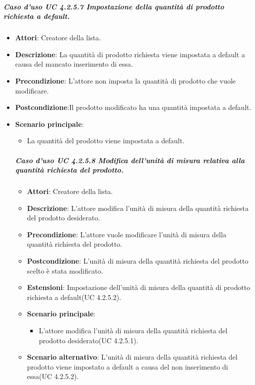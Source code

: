 	
\subparagraph{Caso d'uso UC 4.2.5.7 Impostazione della quantità di prodotto richiesta a default.}
	\begin{itemize}
		\item\textbf{Attori}: Creatore della lista.
		\item\textbf{Descrizione}: La quantità di prodotto richiesta viene impostata a default a causa del mancato inserimento di essa.
		\item\textbf{Precondizione}: L'attore non imposta la quantità di prodotto che vuole modificare.
		\item\textbf{Postcondizione}:Il prodotto modificato ha una quantità  impostata a default.
		\item\textbf{Scenario principale}:
			\begin{itemize}
				\item La quantità del prodotto viene impostata a default.
			\end{itemize}
			
	\subparagraph{Caso d'uso UC 4.2.5.8 Modifica dell'unità di misura relativa alla quantità richiesta del prodotto.}
	\begin{itemize}
		\item\textbf{Attori}: Creatore della lista.
		\item\textbf{Descrizione}: L'attore modifica l'unità di misura della quantità richiesta del prodotto desiderato.
		\item\textbf{Precondizione}: L'attore vuole modificare l'unità di misura della quantità richiesta del prodotto.
		\item\textbf{Postcondizione}: L'unità di misura della quantità richiesta del prodotto scelto è stata modificato.
		\item\textbf{Estensioni}: Impostazione dell'unità di misura della quantità di prodotto richiesta a default(UC 4.2.5.2).
		\item\textbf{Scenario principale}:
			\begin{itemize}
				\item L'attore modifica l'unità di misura della quantità richiesta del prodotto desiderato(UC 4.2.5.1). 
			\end{itemize}
		\item\textbf{Scenario alternativo}: L'unità di misura della quantità richiesta  del prodotto viene impostato a default a causa del non inserimento di essa(UC 4.2.5.2).
		
	\end{itemize}		
			
		
	\end{itemize}
